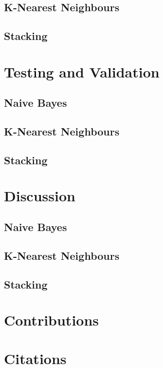 \documentclass{acm_proc_article-sp}
\begin{document}
\subsection{K-Nearest Neighbours}

\subsection{Stacking}

\section{Testing and Validation}
\subsection{Naive Bayes}

\subsection{K-Nearest Neighbours}

\subsection{Stacking}

\section{Discussion}
\subsection{Naive Bayes}

\subsection{K-Nearest Neighbours}

\subsection{Stacking}

\section{Contributions}

\section{Citations}
\end{document}
